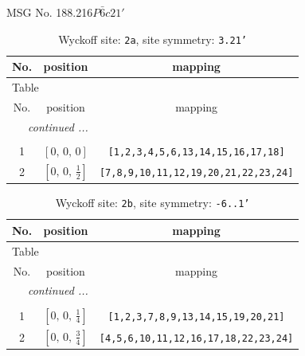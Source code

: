 \documentclass[fleqn,8pt]{jsarticle}
\begin{document}
\setcounter{MaxMatrixCols}{32}

\renewcommand{\tablename}{Table~}
\renewcommand{\figurename}{Figure~}
\begin{center}
\LARGE
MSG No. 188.216\quad$P\bar{6}c21'$
\end{center}
\renewcommand{\arraystretch}{1.2}
\begin{longtable}{ccc}
\caption{Wyckoff site: {\tt 2a}, site symmetry: {\tt 3.21'}}
 \\
 \hline \hline
No. & position & mapping \\ \hline \endfirsthead

\multicolumn{2}{l}{\tablename\ \thetable{}} \\
 \hline \hline
No. & position & mapping \\ \hline \endhead

 \hline \hline
\multicolumn{2}{r}{\footnotesize\it continued ...} \\ \endfoot

 \hline \hline
\multicolumn{2}{r}{} \\ \endlastfoot

1 & $\left[ 0,\, 0,\, 0 \right]$ & {\tt [1,2,3,4,5,6,13,14,15,16,17,18]} \\ \hline
2 & $\left[ 0,\, 0,\, \frac{1}{2} \right]$ & {\tt [7,8,9,10,11,12,19,20,21,22,23,24]} \\
\end{longtable}
\renewcommand{\arraystretch}{1.2}
\begin{longtable}{ccc}
\caption{Wyckoff site: {\tt 2b}, site symmetry: {\tt -6..1'}}
 \\
 \hline \hline
No. & position & mapping \\ \hline \endfirsthead

\multicolumn{2}{l}{\tablename\ \thetable{}} \\
 \hline \hline
No. & position & mapping \\ \hline \endhead

 \hline \hline
\multicolumn{2}{r}{\footnotesize\it continued ...} \\ \endfoot

 \hline \hline
\multicolumn{2}{r}{} \\ \endlastfoot

1 & $\left[ 0,\, 0,\, \frac{1}{4} \right]$ & {\tt [1,2,3,7,8,9,13,14,15,19,20,21]} \\ \hline
2 & $\left[ 0,\, 0,\, \frac{3}{4} \right]$ & {\tt [4,5,6,10,11,12,16,17,18,22,23,24]} \\
\end{longtable}
\end{document}
